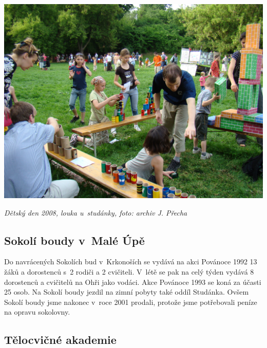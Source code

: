\documentclass[a5paper, 11pt, twoside]{article}
\begin{document}
 \includegraphics[width=\textwidth]{img/43_detsky_den.JPG}

\textit{Dětský den 2008, louka u~studánky, foto: archiv J. Přecha}

\subsection{Sokolí boudy v~Malé Úpě}

Do navrácených Sokolích bud v~Krkonoších se vydává na akci Povánoce 1992
13 žáků a dorostenců s~2 rodiči a 2 cvičiteli. V~létě se pak na celý
týden vydává 8 dorostenců a cvičitelů na Ohři jako vodáci. Akce Povánoce
1993 se koná za účasti 25 osob. Na Sokolí boudy jezdil na zimní pobyty
také oddíl Studánka. Ovšem Sokolí boudy jsme nakonec v~roce 2001
prodali, protože jsme potřebovali peníze na opravu sokolovny.

\subsection{Tělocvičné akademie}
\end{document}
